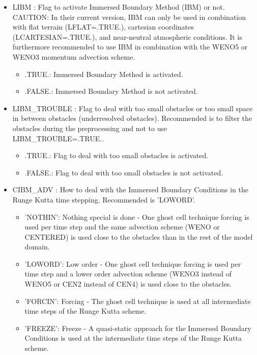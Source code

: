 \begin{itemize}
 
\item LIBM : Flag to
  activate Immersed Boundary Method (IBM) or not. CAUTION: In their
  current version, IBM can only be used in combination with
  flat terrain (LFLAT=.TRUE.), cartesian coordinates
  (LCARTESIAN=.TRUE.), and near-neutral atmospheric conditions.
  It is furthermore recommended to use IBM in combination with
  the WENO5 or WENO3 momentum advection scheme.
\begin{itemize}
\item .TRUE.: Immersed Boundary Method is activated.
\item .FALSE.: Immersed Boundary Method is not activated.
\end{itemize}
  
\item LIBM\_TROUBLE :
  Flag to deal with too small obstacles or too small space in between
  obstacles (underresolved obstacles). Recommended is to filter the
  obstacles during the preprocessing and not to use LIBM\_TROUBLE=.TRUE..
\begin{itemize}
\item .TRUE.: Flag to deal with too small obstacles is activated.
\item .FALSE.: Flag to deal with too small obstacles is not activated.
\end{itemize}
  
\item CIBM\_ADV :
How to deal with the Immersed Boundary Conditions in the Runge Kutta
time stepping. Recommended is 'LOWORD'.
\begin{itemize}
\item 'NOTHIN': Nothing special is done - One ghost cell technique
  forcing is used per time step and the same advection scheme (WENO or
  CENTERED) is used close to the
  obstacles than in the rest of the model domain.
\item 'LOWORD': Low order - One ghost cell technique forcing is used per time
  step and a lower order advection scheme (WENO3 instead of
  WENO5 or CEN2 instead of CEN4) is used close to the obstacles.
\item 'FORCIN': Forcing - The ghost cell technique is used at all intermediate time
  steps of the Runge Kutta scheme.
\item 'FREEZE': Freeze - A quasi-static approach for the Immersed
  Boundary Conditions is used at the intermediate time steps of the Runge
  Kutta scheme.
\end{itemize}


\end{itemize}
